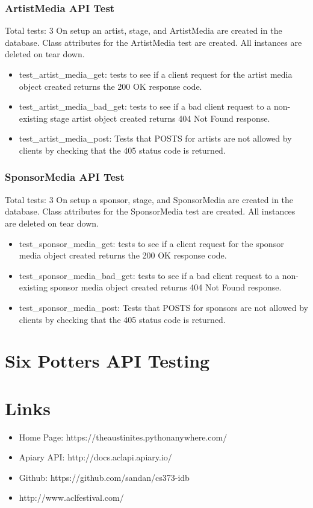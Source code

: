 \documentclass[12pt,english]{scrartcl}
\begin{document}
\subsubsection{ArtistMedia API Test} 
Total tests: 3
On setup an artist, stage, and ArtistMedia are created in the database. Class attributes for the ArtistMedia test are created.
All instances are deleted on tear down.
\begin{itemize}
 \item test\_artist\_media\_get: tests to see if a client request for the artist media object created returns the 200 OK response code.
 
 \item test\_artist\_media\_bad\_get: tests to see if a bad client request to a non-existing stage artist object created returns 
                                     404 Not Found response.
 
 \item test\_artist\_media\_post: Tests that POSTS for artists are not allowed by clients by checking that the 405 status code is returned.
\end{itemize}

\subsubsection{SponsorMedia API Test} 
Total tests: 3
On setup a sponsor, stage, and SponsorMedia are created in the database. Class attributes for the SponsorMedia test are created.
All instances are deleted on tear down.
\begin{itemize}
  \item test\_sponsor\_media\_get: tests to see if a client request for the sponsor media object created returns the 200 OK response code.
 
 \item test\_sponsor\_media\_bad\_get: tests to see if a bad client request to a non-existing sponsor media object created returns 
                                     404 Not Found response.
 
 \item test\_sponsor\_media\_post: Tests that POSTS for sponsors are not allowed by clients by checking that the 405 status code is returned.
\end{itemize}


\section{Six Potters API Testing}


\section{Links}

\begin{itemize}
 \item Home Page: https://theaustinites.pythonanywhere.com/
 \item Apiary API: http://docs.aclapi.apiary.io/
 \item Github: https://github.com/sandan/cs373-idb
 \item http://www.aclfestival.com/
\end{itemize}
\end{document}
